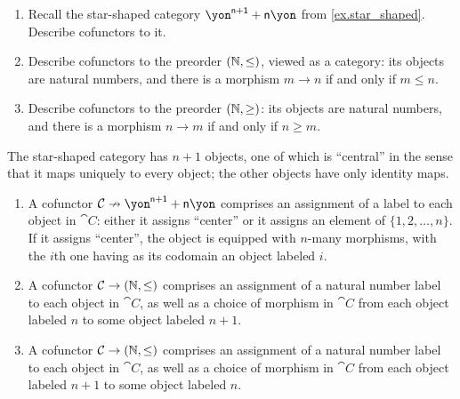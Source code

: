 \documentclass[Book-Poly]{subfiles}
\begin{document}
\begin{exercise}
\begin{enumerate}
	\item Recall the star-shaped category ${\yon}^{\ord{n}+\1}+\ord{n}\yon$ from \cref{ex.star_shaped}. Describe cofunctors to it.
	\item Describe cofunctors to the preorder $(\mathbb{N},\leq)$, viewed as a category: its objects are natural numbers, and there is a morphism $m\to n$ if and only if $m\leq n$.
	\item Describe cofunctors to the preorder $(\mathbb{N},\geq)$: its objects are natural numbers, and there is a morphism $n\to m$ if and only if $n\geq m$.
\qedhere
\end{enumerate}
\begin{solution}
The star-shaped category has $n+1$ objects, one of which is ``central'' in the sense that it maps uniquely to every object; the other objects have only identity maps.
\begin{enumerate}
    \item A cofunctor $\cat{C}\cof\yon^{\ord{n}+\1}+\ord{n}\yon$ comprises an assignment of a label to each object in $\cat{C}$: either it assigns ``center'' or it assigns an element of $\{1,2,\ldots,n\}$. If it assigns ``center'', the object is equipped with $n$-many morphisms, with the $i$th one having as its codomain an object labeled $i$.
    \item A cofunctor $\mathcal{C}\to(\mathbb{N},\leq)$ comprises an assignment of a natural number label to each object in $\cat{C}$, as well as a choice of morphism in $\cat{C}$ from each object labeled $n$ to some object labeled $n+1$.
    \item A cofunctor $\mathcal{C}\to(\mathbb{N},\leq)$ comprises an assignment of a natural number label to each object in $\cat{C}$, as well as a choice of morphism in $\cat{C}$ from each object labeled $n+1$ to some object labeled $n$.
\end{enumerate}
\end{solution}
\end{exercise}
\end{document}
